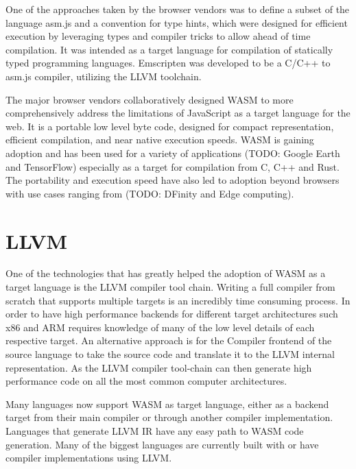\documentclass[11pt]{book}
\begin{document}

One of the approaches taken by the browser vendors was to define a subset of the language asm.js and a convention for type hints, which were designed for efficient execution by leveraging types and compiler tricks to allow ahead of time compilation. It was intended as a target language for compilation of statically typed programming languages. Emscripten was developed to be a C/C++ to asm.js compiler, utilizing the LLVM toolchain. 

The major browser vendors collaboratively designed WASM to more comprehensively address the limitations of JavaScript as a target language for the web. It is a portable low level byte code, designed for compact representation, efficient compilation, and near native execution speeds. WASM is gaining adoption and has been used for a variety of applications (TODO: Google Earth and TensorFlow) especially as a target for compilation from C, C++ and Rust. The portability and execution speed have also led to adoption beyond browsers with use cases ranging from (TODO: DFinity and Edge computing). 

\section{LLVM}
One of the technologies that has greatly helped the adoption of WASM as a target language is the LLVM compiler tool chain. Writing a full compiler from scratch that supports multiple targets is an incredibly time consuming process. In order to have high performance backends for different target architectures such x86 and ARM requires knowledge of many of the low level details of each respective target. An alternative approach is for the Compiler frontend of the source language to take the source code and translate it to the LLVM internal representation. As the LLVM compiler tool-chain can then generate high performance code on all the most common computer architectures. 


Many languages now support WASM as target language, either as a backend target from their main compiler or through another compiler implementation. Languages that generate LLVM IR have any easy path to WASM code generation. Many of the biggest languages are currently built with or have compiler implementations using LLVM.
\end{document}
